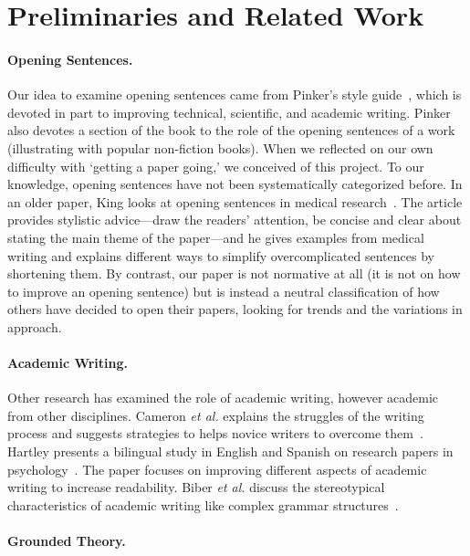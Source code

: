 \documentclass[sigconf,anonymous]{acmart}
\newcommand{\etal}{\textit{et al.}\xspace}
\begin{document}
	
	\section{Preliminaries and Related Work}
	
	\paragraph{Opening Sentences.}
	
	Our idea to examine opening sentences came from Pinker's style guide~\cite{Pin15}, which is devoted in part to improving technical, scientific, and academic writing. Pinker also devotes a section of the book to the role of the opening sentences of a work (illustrating with popular non-fiction books). When we reflected on our own difficulty with `getting a paper going,' we conceived of this project. To our knowledge, opening sentences have not been systematically categorized before. In an older paper, King looks at opening sentences in medical research~\cite{king1967opening}. The article provides stylistic advice---draw the readers' attention, be concise and clear about stating the main theme of the paper---and he gives examples from medical writing and explains different ways to simplify overcomplicated sentences by shortening them. By contrast, our paper is not normative at all (it is not on how to improve an opening sentence) but is instead a neutral classification of how others have decided to open their papers, looking for trends and the variations in approach. 
	
	\paragraph{Academic Writing.}  Other research has examined the role of academic writing, however academic from other disciplines. Cameron \etal explains the struggles of the writing process and suggests strategies to helps novice writers to overcome them~\cite{cameron2009demystifying}. Hartley presents a bilingual study in English and Spanish on research papers in psychology~\cite{hartley2012new}. The paper focuses on improving different aspects of academic writing to increase readability. Biber \etal discuss the stereotypical characteristics of academic writing like complex grammar structures~\cite{biber2010challenging}.   
	
	
	\paragraph{Grounded Theory.}
	
\end{document}
